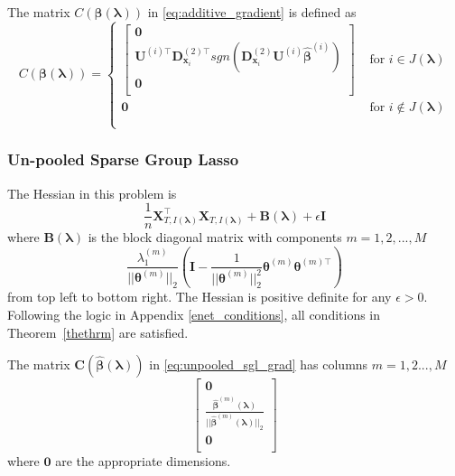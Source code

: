 \documentclass[12pt,letterpaper]{article}
\begin{document}
The matrix $C(\boldsymbol \beta( \boldsymbol \lambda))$ in \eqref{eq:additive_gradient} is defined as
\begin{equation}
C(\boldsymbol \beta( \boldsymbol \lambda))
= \begin{cases}
\begin{bmatrix}
\boldsymbol{0} \\
\boldsymbol {U}^{(i)\top}  \boldsymbol{D}^{(2)\top}_{\boldsymbol{x}_i} 
sgn( \boldsymbol{D}^{(2)}_{\boldsymbol{x}_i} \boldsymbol {U}^{(i)} \hat{\boldsymbol{\beta}}^{(i)}) \\
\boldsymbol{0} \\
\end{bmatrix}
& \text{ for } i \in J(\boldsymbol \lambda) \\
\boldsymbol{0}
& \text{ for } i \not\in J(\boldsymbol \lambda) \\
\\
\end{cases}
\end{equation}


\subsubsection{Un-pooled Sparse Group Lasso}
The Hessian in this problem is
\begin{equation}
\frac{1}{n} \boldsymbol X_{T, I(\boldsymbol \lambda)}^\top \boldsymbol X_{T, I(\boldsymbol \lambda)} + \boldsymbol B(\boldsymbol \lambda) + \epsilon \boldsymbol I
\end{equation}
where $\boldsymbol B(\boldsymbol \lambda)$ is the block diagonal matrix with components  $m=1,2,...,M$
\begin{equation}
\frac{\lambda_1^{(m)}}{|| \boldsymbol \theta^{(m)}||_2}
\left (
\boldsymbol I - 
\frac{1}{|| \boldsymbol \theta^{(m)}||_2^2} \boldsymbol \theta^{(m)} \boldsymbol \theta^{(m) \top}
\right )
\end{equation}
from top left to bottom right. The Hessian is positive definite for any $\epsilon > 0$. Following the logic in Appendix \ref{enet_conditions}, all conditions in Theorem~\ref{thethrm} are satisfied.

The matrix $\boldsymbol C(\hat {\boldsymbol \beta}(\boldsymbol \lambda))$ in \eqref{eq:unpooled_sgl_grad} has columns $m=1,2...,M$ 
\begin{equation}
\begin{bmatrix}
\boldsymbol 0\\
\frac{\hat {\boldsymbol \beta}^{(m)}(\boldsymbol \lambda)}{||\hat{\boldsymbol \beta}^{(m)}(\boldsymbol \lambda)||_2}\\
\boldsymbol 0\\
\end{bmatrix}
\end{equation}
where $\boldsymbol 0$ are the appropriate dimensions.
\end{document}
